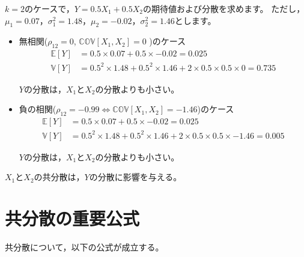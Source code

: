 \documentclass[
  letterpaper,
  pandoc,
  ja=standard,
  jafont = hiragino-pron]{ltjsbook}
\begin{document}
\begin{tcolorbox}[enhanced jigsaw, colframe=quarto-callout-warning-color-frame, breakable, rightrule=.15mm, coltitle=black, title=\textcolor{quarto-callout-warning-color}{\faExclamationTriangle}\hspace{0.5em}{例8}, colbacktitle=quarto-callout-warning-color!10!white, leftrule=.75mm, colback=white, left=2mm, arc=.35mm, opacityback=0, titlerule=0mm, toptitle=1mm, bottomtitle=1mm, bottomrule=.15mm, toprule=.15mm, opacitybacktitle=0.6]

\(k=2\)のケースで，\(Y=0.5X_1 + 0.5 X_2\)の期待値および分散を求めます。
ただし，\(\mu _1 = 0.07\)，\(\sigma _1^2 = 1.48\)，\(\mu_2 = -0.02\)，\(\sigma _2^2 = 1.46\)とします。

\begin{itemize}
\item
  無相関(\(\rho _{12} = 0\), \(\mathbb{COV}[X_1, X_2] = 0\) )のケース \[
  \begin{aligned}
    \mathbb{E}[Y]   &= 0.5 \times 0.07 + 0.5 \times - 0.02 = 0.025\\
    \mathbb{V} [Y] &= 0.5^2 \times 1.48 + 0.5^2 \times 1.46 + 2 \times 0.5 \times 0.5 \times 0 = 0.735
    \end{aligned}
  \]

  \(Y\)の分散は，\(X_1\)と\(X_2\)の分散よりも小さい。
\item
  負の相関(\(\rho _{12} = -0.99 \Leftrightarrow \mathbb{COV}[X_1,X_2] = -1.46\))のケース
  \[
  \begin{aligned}
    \mathbb{E}[Y]   &= 0.5 \times 0.07 + 0.5 \times - 0.02 = 0.025\\
    \mathbb{V} [Y] &= 0.5^2 \times 1.48 + 0.5^2 \times 1.46 + 2 \times 0.5 \times 0.5 \times -1.46 = 0.005
    \end{aligned}
  \]

  \(Y\)の分散は，\(X_1\)と\(X_2\)の分散よりも小さい。
\end{itemize}

\(X_1\)と\(X_2\)の共分散は，\(Y\)の分散に影響を与える。

\end{tcolorbox}

\section{共分散の重要公式}\label{ux5171ux5206ux6563ux306eux91cdux8981ux516cux5f0f}

共分散について，以下の公式が成立する。
\end{document}
